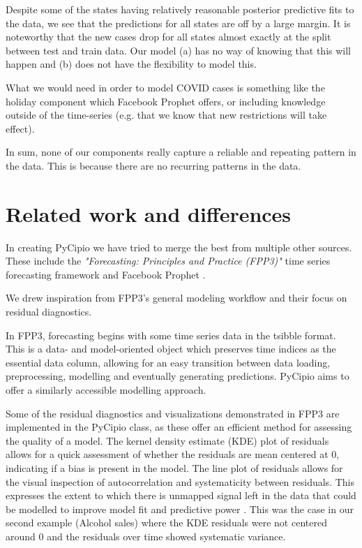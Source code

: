 \documentclass{article}
\begin{document}
Despite some of the states having relatively reasonable posterior predictive fits to the data, we see that the predictions for all states are off by a large margin. It is noteworthy that the new cases drop for all states almost exactly at the split between test and train data. Our model (a) has no way of knowing that this will happen and (b) does not have the flexibility to model this. 

What we would need in order to model COVID cases is something like the holiday component which Facebook Prophet offers, or including knowledge outside of the time-series (e.g. that we know that new restrictions will take effect). 

In sum, none of our components really capture a reliable and repeating pattern in the data. This is because there are no recurring patterns in the data. 


\section{Related work and differences}

In creating PyCipio we have tried to merge the best from multiple other sources. These include the \textit{"Forecasting: Principles and Practice (FPP3)"} time series forecasting framework \cite{fpp3} and Facebook Prophet \cite{taylor2018forecasting}.

We drew inspiration from FPP3’s general modeling workflow and their focus on residual diagnostics. 

In FPP3, forecasting begins with some time series data in the tsibble format. This is a data- and model-oriented object which preserves time indices as the essential data column, allowing for an easy transition between data loading, preprocessing, modelling and eventually generating predictions. PyCipio aims to offer a similarly accessible modelling approach. 

Some of the residual diagnostics and visualizations demonstrated in FPP3 are implemented in the PyCipio class, as these offer an efficient method for assessing the quality of a model.
The kernel density estimate (KDE) plot of residuals allows for a quick assessment of whether the residuals are mean centered at 0, indicating if a bias is present in the model. The line plot of residuals allows for the visual inspection of autocorrelation and systematicity between residuals. This expresses the extent to which there is unmapped signal left in the data that could be modelled to improve model fit and predictive power \cite{fpp3}. This was the case in our second example (Alcohol sales) where the KDE residuals were not centered around 0 and the residuals over time showed systematic variance. 
\end{document}
